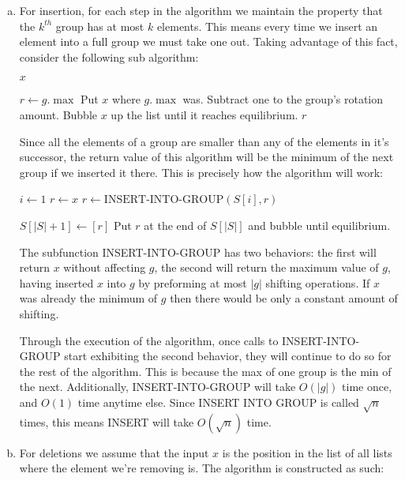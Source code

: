 \documentclass[letterpaper,10pt]{article}
\begin{document}
\begin{enumerate}
	\begin{enumerate}[a)]
		\item For insertion, for each step in the algorithm we maintain the property that the $k^{th}$ group has at most $k$ elements. This means every time we insert an element into a full group we must take one out. Taking advantage of this fact, consider the following sub algorithm:

		\begin{algorithmic}
				\State \Return $x$
			\EndIf

			\State $r \gets g.\max$
			\State Put $x$ where $g.\max$ was.
			\State Subtract one to the group's rotation amount.
			\State Bubble $x$ up the list until it reaches equilibrium.
			\State \Return $r$

		\EndFunction
		\end{algorithmic}
		Since all the elements of a group are smaller than any of the elements in it's successor, the return value of this algorithm will be the minimum of the next group if we inserted it there. This is precisely how the algorithm will work: 
		\begin{algorithmic}
		\Function{INSERT}{$S$, $x$}
			\State $i \gets 1$
			\State $r \gets x$
			\While{$i < |S|$}
				\State $r \gets \text{INSERT-INTO-GROUP}(S[i], r)$
			\EndWhile

			\If{$S[|S|]$ is full}
				\State $S[|S|+1] \gets [r]$
			\Else
				\State Put $r$ at the end of $S[|S|]$ and bubble until equilibrium.
			\EndIf
		\EndFunction
		\end{algorithmic}
		The subfunction INSERT-INTO-GROUP has two behaviors: the first will return $x$ without affecting $g$, the second will return the maximum value of $g$, having inserted $x$ into $g$ by preforming at most $|g|$ shifting operations. If $x$ was already the minimum of $g$ then there would be only a constant amount of shifting.

		Through the execution of the algorithm, once calls to INSERT-INTO-GROUP start exhibiting the second behavior, they will continue to do so for the rest of the algorithm. This is because the max of one group is the min of the next. Additionally, INSERT-INTO-GROUP will take $O(|g|)$ time once, and $O(1)$ time anytime else. Since INSERT INTO GROUP is called $\sqrt{n}$ times, this means INSERT will take $O(\sqrt{n})$ time.

		\item For deletions we assume that the input $x$ is the position in the list of all lists where the element we're removing is. The algorithm is constructed as such:


\end{enumerate}
\end{enumerate}
\end{document}
